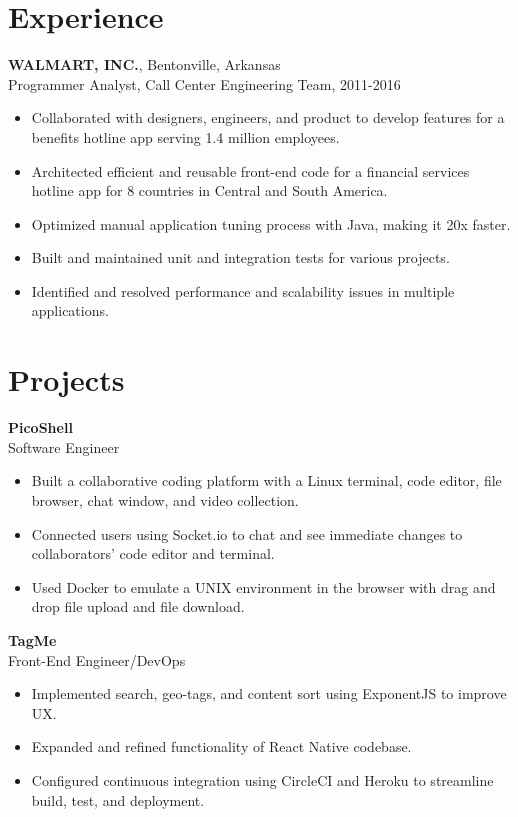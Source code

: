 \documentclass[10pt, letterpaper]{article}
\begin{document}
 \section*{Experience}
 \textbf{WALMART, INC.}, Bentonville, Arkansas \\
 Programmer Analyst, Call Center Engineering Team, 2011-2016 \\
 \begin{itemize}
 \item Collaborated with designers, engineers, and product to develop features for a benefits hotline app serving 1.4 million employees.
 \item Architected efficient and reusable front-end code for a financial services hotline app for 8 countries in Central and South America.
 \item Optimized manual application tuning process with Java, making it 20x faster.
 \item Built and maintained unit and integration tests for various projects.
 \item Identified and resolved performance and scalability issues in multiple applications.
 \end{itemize}

 \section*{Projects}
 \textbf{PicoShell} \\
 Software Engineer \\
 \begin{itemize}
 \item Built a collaborative coding platform with a Linux terminal, code editor, file browser, chat window, and video collection.
 \item Connected users using Socket.io to chat and see immediate changes to collaborators' code editor and terminal.
 \item Used Docker to emulate a UNIX environment in the browser with drag and drop file upload and file download.
 \end{itemize}

 \textbf{TagMe} \\
 Front-End Engineer/DevOps \\
 \begin{itemize}
 \item Implemented search, geo-tags, and content sort using ExponentJS to improve UX.
 \item Expanded and refined functionality of React Native codebase.
 \item Configured continuous integration using CircleCI and Heroku to streamline build, test, and deployment.
 \end{itemize}
\end{document}
